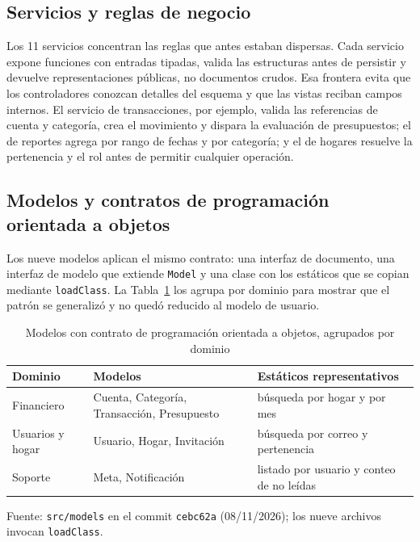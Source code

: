 \documentclass[conference]{IEEEtran}
\begin{document}
\subsection{Servicios y reglas de negocio}

Los 11 servicios concentran las reglas que antes estaban dispersas. Cada
servicio expone funciones con entradas tipadas, valida las estructuras antes de
persistir y devuelve representaciones públicas, no documentos crudos. Esa
frontera evita que los controladores conozcan detalles del esquema y que las
vistas reciban campos internos. El servicio de transacciones, por ejemplo,
valida las referencias de cuenta y categoría, crea el movimiento y dispara la
evaluación de presupuestos; el de reportes agrega por rango de fechas y por
categoría; y el de hogares resuelve la pertenencia y el rol antes de permitir
cualquier operación.

\subsection{Modelos y contratos de programación orientada a objetos}

Los nueve modelos aplican el mismo contrato: una interfaz de documento, una
interfaz de modelo que extiende \texttt{Model} y una clase con los estáticos que
se copian mediante \texttt{loadClass}. La Tabla~\ref{tab:modelos} los agrupa
por dominio para mostrar que el patrón se generalizó y no quedó reducido al
modelo de usuario.

\begin{table}[!t]
\caption{Modelos con contrato de programación orientada a objetos, agrupados por dominio}
\label{tab:modelos}
\centering
\small
\begin{tabular}{@{}>{\raggedright\arraybackslash}p{1.5cm}>{\raggedright\arraybackslash}p{3.9cm}>{\raggedright\arraybackslash}p{2.6cm}@{}}
\toprule
Dominio & Modelos & Estáticos representativos \\
\midrule
Financiero & Cuenta, Categoría, Transacción, Presupuesto & búsqueda por hogar y por mes \\
Usuarios y hogar & Usuario, Hogar, Invitación & búsqueda por correo y pertenencia \\
Soporte & Meta, Notificación & listado por usuario y conteo de no leídas \\
\bottomrule
\end{tabular}

\vspace{2pt}
{\footnotesize Fuente: \texttt{src/models} en el commit \texttt{cebc62a}
(08/11/2026); los nueve archivos invocan \texttt{loadClass}.}
\end{table}
\end{document}
